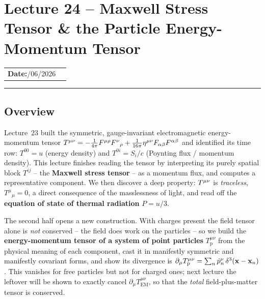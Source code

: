 \section{Lecture 24 -- Maxwell Stress Tensor \& the Particle Energy-Momentum Tensor}\label{sec:lec24}

\begin{center}
\begin{tabular}{ll}
  \textbf{Date:}\quad 28/06/2026 & \\
\end{tabular}
\end{center}
\hrule\vspace{1.5em}

\subsection*{Overview}

Lecture~23 built the symmetric, gauge-invariant electromagnetic energy-momentum tensor
$T^{\mu\nu}=-\tfrac{1}{4\pi}F^{\mu\rho}F^{\nu}{}_{\rho}
+\tfrac{1}{16\pi}\eta^{\mu\nu}F_{\alpha\beta}F^{\alpha\beta}$ and identified its time row:
$T^{00}=u$ (energy density) and $T^{0i}=S_i/c$ (Poynting flux / momentum density). This
lecture finishes reading the tensor by interpreting its purely spatial block $T^{ij}$ -- the
\textbf{Maxwell stress tensor} -- as a momentum flux, and computes a representative
component. We then discover a deep property: $T^{\mu\nu}$ is \emph{traceless},
$T^{\mu}{}_{\mu}=0$, a direct consequence of the masslessness of light, and read off the
\textbf{equation of state of thermal radiation} $P=u/3$.

The second half opens a new construction. With charges present the field tensor alone is
\emph{not} conserved -- the field does work on the particles -- so we build the
\textbf{energy-momentum tensor of a system of point particles} $T^{\mu\nu}_{\text{p}}$ from
the physical meaning of each component, cast it in manifestly symmetric and manifestly
covariant forms, and show its divergence is
$\partial_\mu T^{\mu\nu}_{\text{p}}=\sum_n\dot p_n^\nu\,\delta^3(\mathbf{x}-\mathbf{x}_n)$. This
vanishes for free particles but not for charged ones; next lecture the leftover will be
shown to exactly cancel $\partial_\mu T^{\mu\nu}_{\text{EM}}$, so that the \emph{total}
field-plus-matter tensor is conserved.

